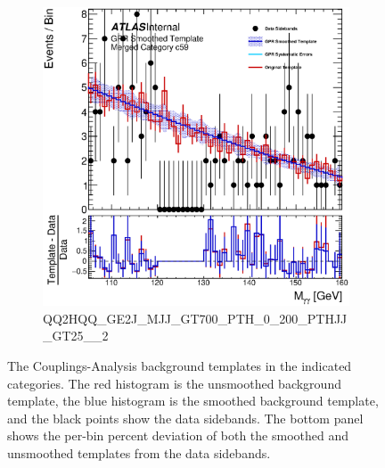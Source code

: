 \begin{figure}
\begin{center}
\begin{subfigure}[T]{0.49\linewidth}
	\centering
	\includegraphics[width=\linewidth]{figures/background/gpr/coupCatTemplates/GPR_Smoothed_Plot_hmgg_c59.eps}
	\caption{\tiny{QQ2HQQ\_GE2J\_MJJ\_GT700\_PTH\_0\_200\_PTHJJ\_GT25\_\_2}}
\end{subfigure}
\caption{The Couplings-Analysis background templates in the indicated categories. The red histogram is the unsmoothed background template, the blue histogram is the smoothed background template, and the black points show the data sidebands. The bottom panel shows the per-bin percent deviation of both the smoothed and unsmoothed templates from the data sidebands. }
 \label{fig:gpr_coupcat_15}
 \end{center}
\end{figure}

